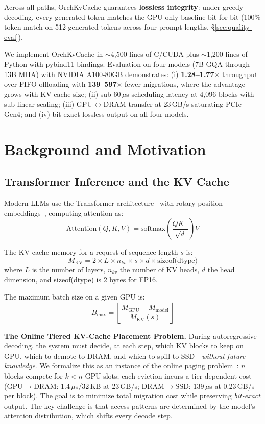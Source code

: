 \documentclass[conference]{IEEEtran}
\begin{document}
Across all paths, OrchKvCache guarantees \textbf{lossless integrity}: under greedy decoding, every generated token matches the GPU-only baseline bit-for-bit (100\% token match on 512 generated tokens across four prompt lengths, \S\ref{sec:quality-eval}).

We implement OrchKvCache in ${\sim}$4,500 lines of C/CUDA plus ${\sim}$1,200 lines of Python with pybind11 bindings. Evaluation on four models (7B GQA through 13B MHA) with NVIDIA A100-80GB demonstrates: (i) \textbf{1.28--1.77$\times$} throughput over FIFO offloading with \textbf{139--597$\times$} fewer migrations, where the advantage grows with KV-cache size; (ii) sub-60\,$\mu$s scheduling latency at 4,096 blocks with sub-linear scaling; (iii) GPU$\leftrightarrow$DRAM transfer at 23\,GB/s saturating PCIe Gen4; and (iv) bit-exact lossless output on all four models.

\section{Background and Motivation}
\subsection{Transformer Inference and the KV Cache}

Modern LLMs use the Transformer architecture~\cite{transformer} with rotary position embeddings~\cite{rope}, computing attention as:
\begin{equation}
\text{Attention}(Q, K, V) = \text{softmax}\!\left(\frac{QK^\top}{\sqrt{d}}\right) V
\end{equation}

The KV cache memory for a request of sequence length $s$ is:
\begin{equation}
M_{\text{KV}} = 2 \times L \times n_{kv} \times s \times d \times \text{sizeof(dtype)}
\end{equation}
where $L$ is the number of layers, $n_{kv}$ the number of KV heads, $d$ the head dimension, and sizeof(dtype) is 2 bytes for FP16.

The maximum batch size on a given GPU is:
\begin{equation}
B_{\max} = \left\lfloor \frac{M_{\text{GPU}} - M_{\text{model}}}{M_{\text{KV}}(s)} \right\rfloor
\end{equation}

\textbf{The Online Tiered KV-Cache Placement Problem.} During autoregressive decoding, the system must decide, at each step, which KV blocks to keep on GPU, which to demote to DRAM, and which to spill to SSD---\emph{without future knowledge}. We formalize this as an instance of the online paging problem~\cite{sleator-tarjan}: $n$ blocks compete for $k < n$ GPU slots; each eviction incurs a tier-dependent cost (GPU$\to$DRAM: 1.4\,$\mu$s/32\,KB at 23\,GB/s; DRAM$\to$SSD: 139\,$\mu$s at 0.23\,GB/s per block). The goal is to minimize total migration cost while preserving \emph{bit-exact} output. The key challenge is that access patterns are determined by the model's attention distribution, which shifts every decode step.
\end{document}

